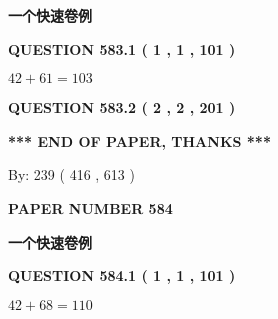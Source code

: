\documentclass{ctexart}
\begin{document}
   
   
   
   
   
 \vspace{0.2in}
{\LARGE {\textbf{ 一个快速卷例}}}
   
   
  
\vspace{0.2in}
  
{\textbf{\Large{QUESTION
583.1 
 ( 1 , 1 , 101 )
}}}
  
  
 
 

$ %
42 +  %
61=   %
103$
 
 
  
\vspace{0.2in}
  
{\textbf{\Large{QUESTION
583.2 
 ( 2 , 2 , 201 )
}}}
  
  
   
   
 \vspace{0.2in}
 
   
   
   
   
\vspace{1.0in} 
{\textbf{\large{ *** END OF PAPER, THANKS *** }}} 
   
   
\hspace{1.0in} By: 
 239 ( 416 ,  613 )
   
   
   
   
\newpage 
\setcounter{page}{ 
   584001 } 
   
   
   
   
 {\textbf{ \Large{ PAPER NUMBER  584  }}}
   
   
\vspace{0.2in}
   
   
   
   
   
   
 \vspace{0.2in}
{\LARGE {\textbf{ 一个快速卷例}}}
   
   
  
\vspace{0.2in}
  
{\textbf{\Large{QUESTION
584.1 
 ( 1 , 1 , 101 )
}}}
  
  
 
 

$ %
42 +  %
68=   %
110$
 
\end{document}
